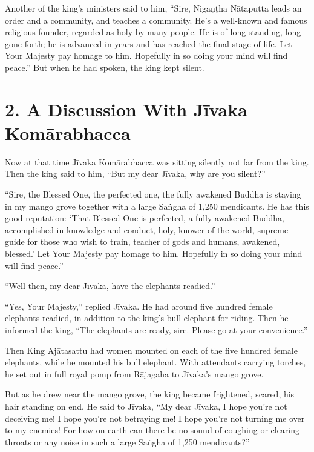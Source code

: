 \documentclass[12pt,openany]{book}%
\begin{document}
Another of the king’s ministers said to him, “Sire, \textsanskrit{Nigaṇṭha} \textsanskrit{Nātaputta} leads an order and a community, and teaches a community. He’s a well-known and famous religious founder, regarded as holy by many people. He is of long standing, long gone forth; he is advanced in years and has reached the final stage of life. Let Your Majesty pay homage to him. Hopefully in so doing your mind will find peace.” But when he had spoken, the king kept silent. 

\section*{2. A Discussion With \textsanskrit{Jīvaka} \textsanskrit{Komārabhacca} }

Now at that time \textsanskrit{Jīvaka} \textsanskrit{Komārabhacca} was sitting silently not far from the king. Then the king said to him, “But my dear \textsanskrit{Jīvaka}, why are you silent?” 

“Sire, the Blessed One, the perfected one, the fully awakened Buddha is staying in my mango grove together with a large \textsanskrit{Saṅgha} of 1,250 mendicants. He has this good reputation: ‘That Blessed One is perfected, a fully awakened Buddha, accomplished in knowledge and conduct, holy, knower of the world, supreme guide for those who wish to train, teacher of gods and humans, awakened, blessed.’ Let Your Majesty pay homage to him. Hopefully in so doing your mind will find peace.” 

“Well then, my dear \textsanskrit{Jīvaka}, have the elephants readied.” 

“Yes, Your Majesty,” replied \textsanskrit{Jīvaka}. He had around five hundred female elephants readied, in addition to the king’s bull elephant for riding. Then he informed the king, “The elephants are ready, sire. Please go at your convenience.” 

Then King \textsanskrit{Ajātasattu} had women mounted on each of the five hundred female elephants, while he mounted his bull elephant. With attendants carrying torches, he set out in full royal pomp from \textsanskrit{Rājagaha} to \textsanskrit{Jīvaka}’s mango grove. 

But as he drew near the mango grove, the king became frightened, scared, his hair standing on end. He said to \textsanskrit{Jīvaka}, “My dear \textsanskrit{Jīvaka}, I hope you’re not deceiving me! I hope you’re not betraying me! I hope you’re not turning me over to my enemies! For how on earth can there be no sound of coughing or clearing throats or any noise in such a large \textsanskrit{Saṅgha} of 1,250 mendicants?” 
\end{document}
